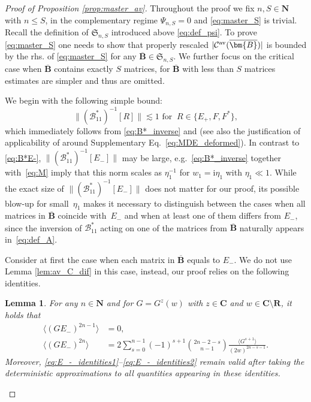 \documentclass[10pt]{amsart}
\newtheorem{lemma}[theorem]{Lemma}
\numberwithin{equation}{section}
\newcommand{\R}{\mathbf{R}}
\newcommand{\C}{\mathbf{C}}
\newcommand{\N}{\mathbf{N}}
\newcommand{\ii}{\mathrm{i}}
\begin{document}
\begin{proof}[Proof of Proposition \ref{prop:master_av}] Throughout the proof we fix $n, S\in\N$ with $n\le S$, in the complementary regime $\Psi_{n,S}=0$ and \eqref{eq:master_S} is trivial. Recall the definition of $\mathfrak{S}_{n,S}$ introduced above \eqref{eq:def_psi}. To prove \eqref{eq:master_S} one needs to show that properly rescaled $|\mathcal{C}^{\rm{av}}(\overline{\bm{B}})|$ is bounded by the rhs. of \eqref{eq:master_S} for any $\overline{\bm{B}}\in\mathfrak{S}_{n,S}$. We further focus on the critical case when $\overline{\bm{B}}$ contains exactly $S$ matrices, for $\overline{\bm{B}}$ with less than $S$ matrices estimates are simpler and thus are omitted.

We begin with the following simple bound:
\begin{equation}
\|(\mathcal{B}_{11}^*)^{-1}[R]\|\lesssim 1\,\,\text{for}\,\,\ R\in \{E_+,F,F^*\},
\label{eq:B*E-}
\end{equation}
which immediately follows from \eqref{eq:B*_inverse} and \cite[Eq.(3.1),(3.4)]{eigenv_decorr} (see also the justification of applicability of \cite{eigenv_decorr} around Supplementary Eq.~\eqref{eq:MDE_deformed}).
In contrast to \eqref{eq:B*E-}, $\|(\mathcal{B}_{11}^*)^{-1}[E_-]\|$ may be large, e.g.~\eqref{eq:B*_inverse} together with~\eqref{eq:M} imply that this norm scales as $\eta_1^{-1}$ for $w_1=\ii\eta_1$ with $\eta_1\ll 1$. While the exact size of $\|(\mathcal{B}_{11}^*)^{-1}[E_-]\|$ does not matter for our proof, its possible blow-up for small~$\eta_1$ makes it necessary to distinguish between the cases when all matrices in $\overline{\bm{B}}$ coincide with~$E_-$ and when at least one of them differs from $E_-$, since the inversion of $\mathcal{B}_{11}^*$ acting on one of the matrices from $\overline{\bm{B}}$ naturally appears in~\eqref{eq:def_A}.

Consider at first the case when each matrix in $\overline{\bm{B}}$ equals to $E_-$. We do not use Lemma \ref{lem:av_C_dif} in this case, instead, our proof relies on the following identities.
\begin{lemma}\label{lem:E_-}  For any $n\in\N$ and for $G=G^z(w)$ with $z\in\C$ and $w\in\C\setminus\R$, it holds that
\begin{align}
\langle (GE_-)^{2n-1}\rangle &= 0,\label{eq:E_-_identities1}\\
\langle (GE_-)^{2n}\rangle &= 2\sum_{s=0}^{n-1} (-1)^{s+1} \binom{2n-2-s}{n-1} \frac{\langle G^{s+1}\rangle}{(2w)^{2n-s-1}}. \label{eq:E_-_identities2}
\end{align}
Moreover, \eqref{eq:E_-_identities1}--\eqref{eq:E_-_identities2} remain valid after taking the deterministic approximations to all quantities appearing in these identities.
\end{lemma}


\end{proof}
\end{document}
